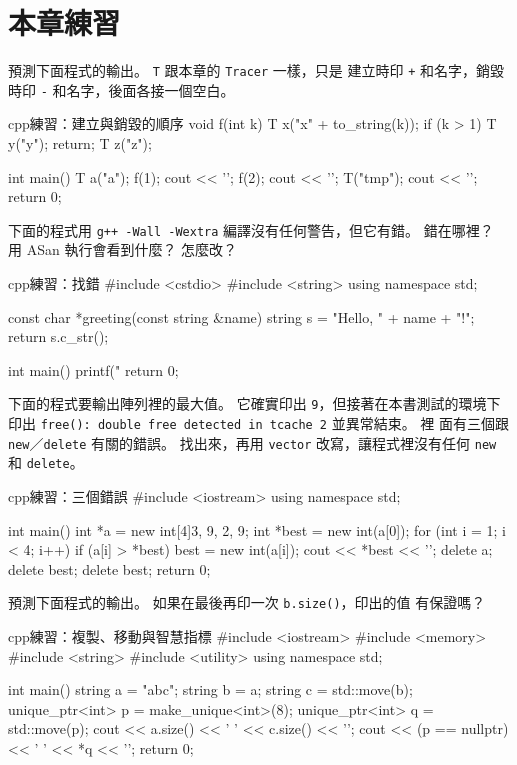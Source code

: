 \section{本章練習}
\label{sec:ch4-exercises}

\begin{drills}[label=drills:ch4]
\item 預測下面程式的輸出。 \texttt{T} 跟本章的 \texttt{Tracer} 一樣，只是
建立時印 \texttt{+} 和名字，銷毀時印 \texttt{-} 和名字，後面各接一個空白。
\begin{code}{cpp}{練習：建立與銷毀的順序}
void f(int k) {
    T x("x" + to_string(k));
    if (k > 1) {
        T y("y");
        return;
    }
    T z("z");
}

int main() {
    T a("a");
    f(1);
    cout << '\n';
    f(2);
    cout << '\n';
    T("tmp");
    cout << '\n';
    return 0;
}
\end{code}
\item 下面的程式用 \texttt{g++ -Wall -Wextra} 編譯沒有任何警告，但它有錯。
錯在哪裡？ 用 ASan 執行會看到什麼？ 怎麼改？
\begin{code}{cpp}{練習：找錯}
#include <cstdio>
#include <string>
using namespace std;

const char *greeting(const string &name) {
    string s = "Hello, " + name + "!";
    return s.c_str();
}

int main() {
    printf("%
    return 0;
}
\end{code}
\item 下面的程式要輸出陣列裡的最大值。 它確實印出 \texttt{9}，但接著在本書測試的環境下
印出 \texttt{free(): double free detected in tcache 2} 並異常結束。 裡
面有三個跟 \texttt{new}／\texttt{delete} 有關的錯誤。 找出來，再用 \texttt{vector}
改寫，讓程式裡沒有任何 \texttt{new} 和 \texttt{delete}。
\begin{code}{cpp}{練習：三個錯誤}
#include <iostream>
using namespace std;

int main() {
    int *a = new int[4]{3, 9, 2, 9};
    int *best = new int(a[0]);
    for (int i = 1; i < 4; i++) {
        if (a[i] > *best) {
            best = new int(a[i]);
        }
    }
    cout << *best << '\n';
    delete a;
    delete best;
    delete best;
    return 0;
}
\end{code}
\item 預測下面程式的輸出。 如果在最後再印一次 \texttt{b.size()}，印出的值
有保證嗎？
\begin{code}{cpp}{練習：複製、移動與智慧指標}
#include <iostream>
#include <memory>
#include <string>
#include <utility>
using namespace std;

int main() {
    string a = "abc";
    string b = a;
    string c = std::move(b);
    unique_ptr<int> p = make_unique<int>(8);
    unique_ptr<int> q = std::move(p);
    cout << a.size() << ' ' << c.size() << '\n';
    cout << (p == nullptr) << ' ' << *q << '\n';
    return 0;
}
\end{code}
\end{drills}

